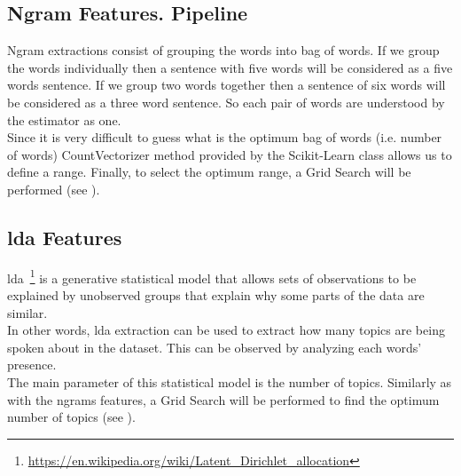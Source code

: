 \subsection{Ngram Features. Pipeline}
Ngram extractions consist of grouping the words into bag of words. If we group the words individually then a sentence with five words will be considered as a five words sentence. If we group two words together then a sentence of six words will be considered as a three word sentence. So each pair of words are understood by the estimator as one.\\
Since it is very difficult to guess what is the optimum bag of words (i.e. number of words) CountVectorizer method provided by the Scikit-Learn class allows us to define a range. Finally, to select the optimum range, a Grid Search will be performed (see ).
\subsection{\ac{lda} Features}
\ac{lda}~\footnote{\url{https://en.wikipedia.org/wiki/Latent_Dirichlet_allocation}} is a generative statistical model that allows sets of observations to be explained by unobserved groups that explain why some parts of the data are similar.\\ In other words, \ac{lda} extraction can be used to extract how many topics are being spoken about in the dataset. This can be observed by analyzing each words' presence.\\
The main parameter of this statistical model is the number of topics. Similarly as with the ngrams features, a Grid Search will be performed to find the optimum number of topics (see ).


